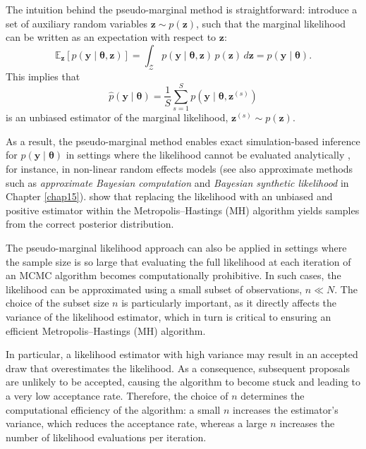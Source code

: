 The intuition behind the pseudo-marginal method is straightforward: introduce a set of auxiliary random variables \( \mathbf{z} \sim p(\mathbf{z}) \), such that the marginal likelihood can be written as an expectation with respect to \( \mathbf{z} \):
\[
\mathbb{E}_{\mathbf{z}}[p(\mathbf{y} \mid \boldsymbol{\theta}, \mathbf{z})] = \int_{\mathcal{Z}} p(\mathbf{y} \mid \boldsymbol{\theta}, \mathbf{z}) \, p(\mathbf{z}) \, d\mathbf{z} = p(\mathbf{y} \mid \boldsymbol{\theta}).
\]
This implies that
\[
\hat{p}(\mathbf{y} \mid \boldsymbol{\theta}) = \frac{1}{S} \sum_{s=1}^S p(\mathbf{y} \mid \boldsymbol{\theta}, \mathbf{z}^{(s)})
\]
is an unbiased estimator of the marginal likelihood, \( \mathbf{z}^{(s)} \sim p(\mathbf{z}) \).

As a result, the pseudo-marginal method enables exact simulation-based inference for \( p(\mathbf{y} \mid \boldsymbol{\theta}) \) in settings where the likelihood cannot be evaluated analytically \cite{andrieu2009pseudoefficient}, for instance, in non-linear random effects models (see also approximate methods such as \textit{approximate Bayesian computation} and \textit{Bayesian synthetic likelihood} in Chapter \ref{chap15}). \cite{andrieu2009pseudoefficient} show that replacing the likelihood with an unbiased and positive estimator within the Metropolis–Hastings (MH) algorithm yields samples from the correct posterior distribution.

The pseudo-marginal likelihood approach can also be applied in settings where the sample size is so large that evaluating the full likelihood at each iteration of an MCMC algorithm becomes computationally prohibitive. In such cases, the likelihood can be approximated using a small subset of observations, \( n \ll N \). The choice of the subset size \( n \) is particularly important, as it directly affects the variance of the likelihood estimator, which in turn is critical to ensuring an efficient Metropolis–Hastings (MH) algorithm.

In particular, a likelihood estimator with high variance may result in an accepted draw that overestimates the likelihood. As a consequence, subsequent proposals are unlikely to be accepted, causing the algorithm to become stuck and leading to a very low acceptance rate. Therefore, the choice of \( n \) determines the computational efficiency of the algorithm: a small \( n \) increases the estimator's variance, which reduces the acceptance rate, whereas a large \( n \) increases the number of likelihood evaluations per iteration.

